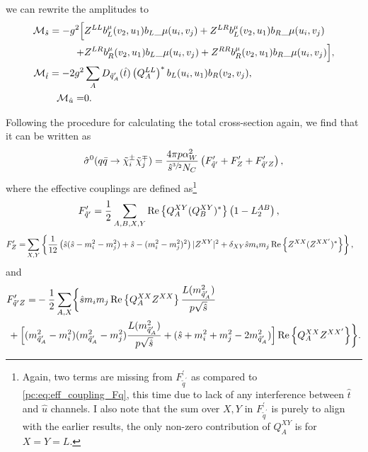 \documentclass[../main.tex]{subfiles}
\begin{document}
we can rewrite the amplitudes to
\begin{subequations}
  \begin{align}
    \nonumber
    \mathcal{M}_{\hat{s}} = -g^2 \Big[ &
    Z^{LL} b_L^\mu(v_2, u_1){b_L}\_{\mu}(u_i, v_j) + Z^{LR} b_L^\mu(v_2, u_1){b_R}\_{\mu}(u_i, v_j)                         \\
    +                         & Z^{LR} b_{R}^\mu(v_2, u_1){b_L}\_{\mu}(u_i, v_j) +
    Z^{RR} b_R^\mu(v_2, u_1){b_R}\_{\mu}(u_i, v_j) \Big],                                                                   \\
    \mathcal{M}_{\hat{t}} = -2g^2      & \sum_A D_{\tilde{q}^\prime_A}(\hat{t}) \left(Q_A^{LL}\right)^\ast b_L(u_i, u_1) b_R(v_2, v_j), \\
    \mathcal{M}_{\hat{u}} =            & 0.
  \end{align}
\end{subequations}

Following the procedure for calculating the total cross-section again, we find that it can be written as
\begin{equation}
  \hat\sigma^0(q\bar{q} \to \tilde\chi^\pm_i \tilde\chi^\mp_j) = \frac{4 \pi p \alpha_W^2}{\hat{s}^{\sfrac{3}{2}} N_C} \left(F^\prime_{\tilde{q}^\prime} + F^\prime_Z + F^\prime_{\tilde{q}^\prime Z}\right),
\end{equation}
where the effective couplings are defined as\footnote{Again, two terms are missing from \(F^{\prime}_{\tilde{q}^\prime}\) as compared to \cref{pc:eq:eff_coupling_Fq}, this time due to lack of any interference between \(\hat{t}\) and \(\hat{u}\) channels. I also note that the sum over \(X, Y\) in \(F^\prime_{\tilde{q}^\prime}\) is purely to align with the earlier results, the only non-zero contribution of \(Q_A^{XY}\) is for \(X = Y = L\).}
\begin{align}
  \label{pc:eq:CC_eff_coupling_Fq}
  F^{\prime}_{\tilde{q}^\prime} = \frac{1}{2} \sum_{A,B,X,Y} & \operatorname{Re}\left\{Q_A^{XY} (Q_B^{XY})^\ast\right\} \left(1 - L_2^{AB}\right),
\end{align}
\begin{align}
  \label{pc:eq:CC_eff_coupling_FZ}
  F^{\prime}_{Z} = & \sum_{X,Y} \left\{\frac{1}{12} \left(\hat{s}(\hat{s}-m_i^2-m_j^2) + \hat{s} - (m_i^2-m_j^2)^2\right) |Z^{XY}|^2 + \delta_{XY} \hat{s}m_i m_j \operatorname{Re}\left\{Z^{XX} (Z^{XX^\prime})^\ast\right\}\right\},
\end{align}
and
\begin{align}
  \label{pc:eq:CC_eff_coupling_FqZ}
  \nonumber
  F^\prime_{\tilde{q}^\prime Z} = & -\frac{1}{2} \sum_{A,X} \biggl\{
  \hat{s} m_i m_j \Re{Q_{A}^{XX} Z^{XX}}\frac{L(m_{\tilde{q}^\prime_A}^2)}{p \sqrt{\hat{s}}}                                                                                                                                                                               \\
                                  & \hspace{-1cm}+ \Bigl[(m_{\tilde{q}^\prime_A}^2-m_i^2)(m_{\tilde{q}^\prime_A}^2-m_j^2) \frac{L(m_{\tilde{q}^\prime_A}^2)}{p \sqrt{\hat{s}}} + (\hat{s} + m_i^2 + m_j^2 - 2m_{\tilde{q}^\prime_A}^2)\Bigr] \Re{Q_{A}^{XX} Z^{XX^\prime}}
  \biggr\}.
\end{align}
\end{document}
